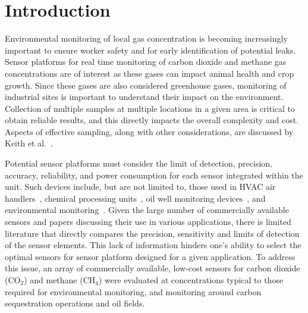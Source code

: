 \documentclass[sensors,article,submit,moreauthors,pdftex]{Definitions/mdpi}
\begin{document}
	
	\section{Introduction}
	\label{sec:intro}
		
		Environmental monitoring of local gas concentration is becoming increasingly important to ensure worker safety and for early identification of potential leaks.
		Sensor platforms for real time monitoring of carbon dioxide and methane gas concentrations are of interest as these gases can impact animal health and crop growth.
		Since these gases are also considered greenhouse gases, monitoring of industrial sites is important to understand their impact on the environment.
		Collection of multiple samples at multiple locations in a given area is critical to obtain reliable results, and this directly impacts the overall complexity and cost.
		Aspects of effective sampling, along with other considerations, are discussed by Keith et al.~\cite{keith_principles_1983}.
		
		Potential sensor platforms must consider the limit of detection, precision, accuracy, reliability, and power consumption for each sensor integrated within the unit.
		Such devices include, but are not limited to, those used in HVAC air handlers~\cite{yang_systematic_2014,chung_selective_2008}, chemical processing units~\cite{won_nonlinear_2012}, oil well monitoring devices~\cite{yi_remote_2010,somov_deployment_2013}, and environmental monitoring~\cite{pering_high_2014,black_formation_2012,guohua_study_2012,karunanithi_performance_2009,shendell_outdoor_2012}.
		Given the large number of commercially available sensors and papers discussing their use in various applications, there is limited literature that directly compares the precision, sensitivity and limits of detection of the sensor elements.
		This lack of information hinders one's ability to select the optimal sensors for sensor platform designed for a given application.
		To address this issue, an array of commercially available, low-cost sensors for carbon dioxide (CO$_2$) and methane (CH$_4$) were evaluated at concentrations typical to those required for environmental monitoring, and monitoring around carbon sequestration operations and oil fields.
		
\end{document}
